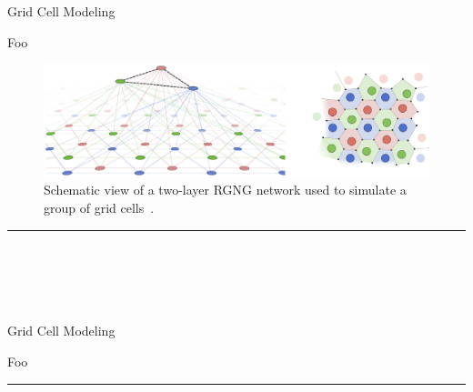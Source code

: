 \begin{frame}{Grid Cell Modeling }

\justifying

\vspace{1em}
Foo

\vspace{8em}





\begin{figure}
\includegraphics[width=0.7\linewidth]{diss/rgng_ex.jpg}

\vspace{-1em}
\caption{\scriptsize Schematic view of a two-layer RGNG network used to 
simulate a group of grid cells~\cite{Kerdels2016}.}
\end{figure}

\vspace{-2em}

\begin{center}
\rule{2cm}{0.4pt}\\[0.5em]
\end{center}

\\[1em]
\\[1em]
\cover

\end{frame}



\begin{frame}{Grid Cell Modeling }

\justifying

Foo


\vspace{1em}

\begin{center}
\rule{2cm}{0.4pt}\\[0.5em]
\end{center}

\bestpaper\\[1em]

\end{frame}




